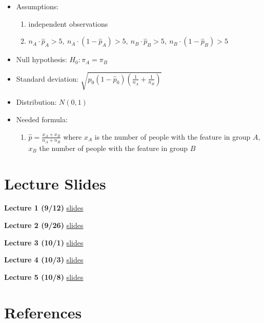 \documentclass[]{book}
\providecommand{\tightlist}{%
  \setlength{\itemsep}{0pt}\setlength{\parskip}{0pt}}
\theoremstyle{definition}
\theoremstyle{definition}
\theoremstyle{definition}
\theoremstyle{remark}
\begin{document}
\begin{itemize}
  \begin{itemize}
  \tightlist
  \item
    Assumptions:

    \begin{enumerate}
    \def\labelenumi{\roman{enumi}.}
    \tightlist
    \item
      independent observations
    \item
      \(n_A\cdot \hat{p}_A > 5,\ n_A\cdot(1-\hat{p}_A) > 5,\ n_B\cdot \hat{p}_B > 5,\ n_B\cdot(1-\hat{p}_B) > 5\)
    \end{enumerate}
  \item
    Null hypothesis: \(H_0: \pi_A = \pi_B\)
  \item
    Standard deviation: \(\sqrt{\hat{p}_0(1-\hat{p}_0)\left(\frac{1}{n_A} + \frac{1}{n_B}\right)}\)
  \item
    Distribution: \(N(0,1)\)
  \item
    Needed formula:

    \begin{enumerate}
    \def\labelenumi{\roman{enumi}.}
    \tightlist
    \item
      \(\hat{p} = \frac{x_A + x_B}{n_A + n_B}\) where \(x_A\) is the number of people with the feature in group \(A\), \(x_B\) the number of people with the feature in group \(B\)
    \end{enumerate}
  \end{itemize}
\end{itemize}

\hypertarget{appendix-appendix}{%
\appendix}


\hypertarget{lecture-slides}{%
\chapter{Lecture Slides}\label{lecture-slides}}

\textbf{Lecture 1 (9/12)} \href{./lectures/lecture01/lec01_slides.html}{slides}

\textbf{Lecture 2 (9/26)} \href{./lectures/lecture02/lec02_slides.html}{slides}

\textbf{Lecture 3 (10/1)} \href{./lectures/lecture03/lec03_slides.html}{slides}

\textbf{Lecture 4 (10/3)} \href{./lectures/lecture04/lec04_slides.html}{slides}

\textbf{Lecture 5 (10/8)} \href{./lectures/lecture05/lec05_slides.html}{slides}

\hypertarget{references}{%
\chapter*{References}\label{references}}


\end{document}
